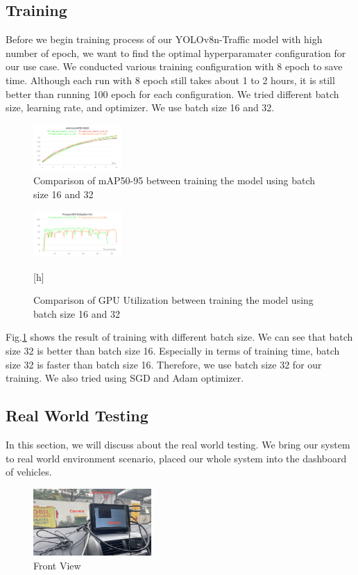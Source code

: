\documentclass[conference]{IEEEtran}
\begin{document}
\subsection{Training}
Before we begin training process of our YOLOv8n-Traffic model with high number of epoch, we want to find the optimal hyperparamater configuration for our use case. We conducted various training configuration with 8 epoch to save time.
Although each run with 8 epoch still takes about 1 to 2 hours, it is still better than running 100 epoch for each configuration.
We tried different batch size, learning rate, and optimizer. We use batch size 16 and 32.
\begin{figure}
\centering
\includegraphics[width=0.3\textwidth,keepaspectratio]{mAP_batch_size_comparison.png} %
\caption{Comparison of mAP50-95 between training the model using batch size 16 and 32}
\label{fig:batch_size}
\end{figure}

\begin{figure}
\centering
\includegraphics[width=0.3\textwidth,keepaspectratio]{gpu_utilization_comparison.png} 
\caption{Comparison of GPU Utilization between training the model using batch size 16 and 32}
\label{fig:gpu_utilization}[h]
\end{figure}
Fig.\ref{fig:batch_size} shows the result of training with different batch size. We can see that batch size 32 is better than batch size 16. Especially in terms of training time, batch size 32 is faster than batch size 16.
Therefore, we use batch size 32 for our training. We also tried using SGD and Adam optimizer.


\subsection{Real World Testing}
In this section, we will discuss about the real world testing. We bring our system to real world environment scenario, placed our whole system into the dashboard of vehicles.
\begin{figure}[h]
    \centering
    \includegraphics[width=0.4\textwidth,keepaspectratio]{mounted_camera_front_view.jpg}
    \caption{Front View}
    \label{fig:front_view}
\end{figure}
\end{document}

